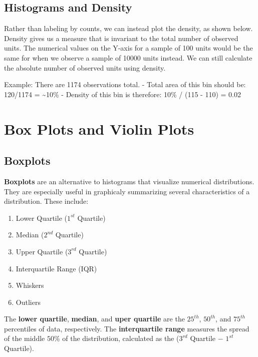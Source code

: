 \documentclass[
  letterpaper,
  DIV=11,
  numbers=noendperiod]{scrreprt}
\providecommand{\tightlist}{%
  \setlength{\itemsep}{0pt}\setlength{\parskip}{0pt}}\usepackage{longtable,booktabs,array}
\begin{document}
\hypertarget{histograms-and-density}{%
\subsection{Histograms and Density}\label{histograms-and-density}}

Rather than labeling by counts, we can instead plot the density, as
shown below. Density gives us a measure that is invariant to the total
number of observed units. The numerical values on the Y-axis for a
sample of 100 units would be the same for when we observe a sample of
10000 units instead. We can still calculate the absolute number of
observed units using density.

Example: There are 1174 observations total. - Total area of this bin
should be: 120/1174 = \textasciitilde10\% - Density of this bin is
therefore: 10\% / (115 - 110) = 0.02

\hypertarget{box-plots-and-violin-plots}{%
\section{Box Plots and Violin Plots}\label{box-plots-and-violin-plots}}

\hypertarget{boxplots}{%
\subsection{Boxplots}\label{boxplots}}

\textbf{Boxplots} are an alternative to histograms that visualize
numerical distributions. They are especially useful in graphicaly
summarizing several characteristics of a distribution. These include:

\begin{enumerate}
\def\labelenumi{\arabic{enumi}.}
\tightlist
\item
  Lower Quartile (\(1^{st}\) Quartile)
\item
  Median (\(2^{nd}\) Quartile)
\item
  Upper Quartile (\(3^{rd}\) Quartile)
\item
  Interquartile Range (IQR)
\item
  Whiskers
\item
  Outliers
\end{enumerate}

The \textbf{lower quartile}, \textbf{median}, and \textbf{uper quartile}
are the \(25^{th}\), \(50^{th}\), and \(75^{th}\) percentiles of data,
respectively. The \textbf{interquartile range} measures the spread of
the middle \(50\)\% of the distribution, calculated as the (\(3^{rd}\)
Quartile \(-\) \(1^{st}\) Quartile).
\end{document}
